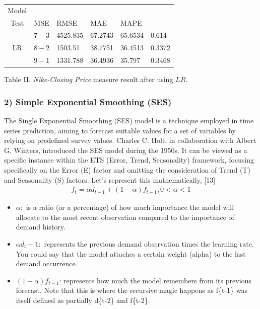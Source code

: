 \documentclass[conference]{IEEEtran}
\begin{document}
{\begin{table}[H]
\centering
\begin{tabularx}{\columnwidth}{|c|c|X|X|X|X|}
\hline
Model & \begin{tabular}{c}
Train- \\
Test
\end{tabular} & MSE & RMSE & MAE & MAPE \\
\hline
\multirow{3}{*}{LR} & $7-3$ & 4525.835 & 67.2743 & 65.6534 & 0.614 \\
\cline{2-6}
 & $8-2$ & 1503.51 & 38.7751 & 36.4513 & 0.3372 \\
\cline{2-6}
 & $9-1$ & 1331.788 & 36.4936 & 35.797 & 0.3468 \\
\hline
\end{tabularx}
\end{table}
Table II. \textit{Nike-Closing Price} measure result after using $LR$.\\
\subsubsection*{\textbf{2) Simple Exponential Smoothing} (SES)}

The Single Exponential Smoothing (SES) model is a technique employed in time series prediction, aiming to forecast suitable values for a set of variables by relying on predefined survey values. Charles C. Holt, in collaboration with Albert G. Winters, introduced the SES model during the 1950s. It can be viewed as a specific instance within the ETS (Error, Trend, Seasonality) framework, focusing specifically on the Error (E) factor and omitting the consideration of Trend (T) and Seasonality (S) factors. Let’s represent this mathematically, [13]
\textbf{\begin{align*}
f_t = \alpha d_{t-1} + (1 - \alpha)  f_{t-1}, 0 < \alpha <1  
\end{align*}}
\begin{itemize}
    \item \(\alpha\): is a ratio (or a percentage) of how much importance the model will allocate to the most recent observation compared to the importance of demand history.

    \item \(\alpha d_t-1\): represents the previous demand observation times the learning rate. You could say that the model attaches a certain weight (alpha) to the last demand occurrence.

    \item \((1 - \alpha)  f_{t-1}\): represents how much the model remembers from its previous forecast. Note that this is where the recursive magic happens as f\{t-1\} was itself defined as partially d\{t-2\} and f\{t-2\}.
\end{itemize}

}
\end{document}
